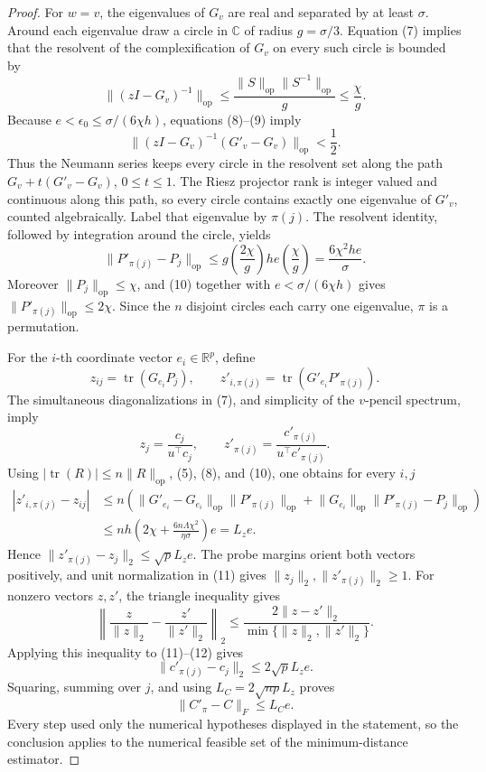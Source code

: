 \documentclass{article}
\begin{document}
\begin{proof}
For \(w=v\), the eigenvalues of \(G_v\) are real and separated by at least \(\sigma\). Around each eigenvalue draw a circle in \(\mathbb C\) of radius \(g=\sigma/3\). Equation (7) implies that the resolvent of the complexification of \(G_v\) on every such circle is bounded by
\[
 \lVert(zI-G_v)^{-1}\rVert_{\mathrm{op}}
 \le\frac{\lVert S\rVert_{\mathrm{op}}\lVert S^{-1}\rVert_{\mathrm{op}}}{g}
 \le\frac\chi g.
 \tag{9}
\]
Because \(e<\epsilon_0\le\sigma/(6\chi h)\), equations (8)--(9) imply
\[
 \lVert(zI-G_v)^{-1}(G'_v-G_v)\rVert_{\mathrm{op}}<\frac12.
\]
Thus the Neumann series keeps every circle in the resolvent set along the path \(G_v+t(G'_v-G_v)\), \(0\le t\le1\). The Riesz projector rank is integer valued and continuous along this path, so every circle contains exactly one eigenvalue of \(G'_v\), counted algebraically. Label that eigenvalue by \(\pi(j)\). The resolvent identity, followed by integration around the circle, yields
\[
 \lVert P'_{\pi(j)}-P_j\rVert_{\mathrm{op}}
 \le g\left(\frac{2\chi}{g}\right)he\left(\frac\chi g\right)
 =\frac{6\chi^2he}{\sigma}.
 \tag{10}
\]
Moreover \(\lVert P_j\rVert_{\mathrm{op}}\le\chi\), and (10) together with \(e<\sigma/(6\chi h)\) gives \(\lVert P'_{\pi(j)}\rVert_{\mathrm{op}}\le2\chi\). Since the \(n\) disjoint circles each carry one eigenvalue, \(\pi\) is a permutation.

For the \(i\)-th coordinate vector \(e_i\in\mathbb R^p\), define
\[
 z_{ij}=\operatorname{tr}(G_{e_i}P_j),
 \qquad
 z'_{i,\pi(j)}=\operatorname{tr}(G'_{e_i}P'_{\pi(j)}).
\]
The simultaneous diagonalizations in (7), and simplicity of the \(v\)-pencil spectrum, imply
\[
 z_j=\frac{c_j}{u^\top c_j},
 \qquad
 z'_{\pi(j)}=\frac{c'_{\pi(j)}}{u^\top c'_{\pi(j)}}.
 \tag{11}
\]
Using \(|\operatorname{tr}(R)|\le n\lVert R\rVert_{\mathrm{op}}\), (5), (8), and (10), one obtains for every \(i,j\)
\[
 \begin{aligned}
 |z'_{i,\pi(j)}-z_{ij}|
 &\le n\left(
 \lVert G'_{e_i}-G_{e_i}\rVert_{\mathrm{op}}
 \lVert P'_{\pi(j)}\rVert_{\mathrm{op}}
 +\lVert G_{e_i}\rVert_{\mathrm{op}}
 \lVert P'_{\pi(j)}-P_j\rVert_{\mathrm{op}}
 \right)\\
 &\le nh\left(2\chi+\frac{6n\Lambda\chi^2}{\eta\sigma}\right)e
 =L_ze.
 \end{aligned}
 \tag{12}
\]
Hence \(\lVert z'_{\pi(j)}-z_j\rVert_2\le\sqrt pL_ze\). The probe margins orient both vectors positively, and unit normalization in (11) gives \(\lVert z_j\rVert_2,\lVert z'_{\pi(j)}\rVert_2\ge1\). For nonzero vectors \(z,z'\), the triangle inequality gives
\[
 \left\lVert\frac z{\lVert z\rVert_2}-
 \frac{z'}{\lVert z'\rVert_2}\right\rVert_2
 \le\frac{2\lVert z-z'\rVert_2}
 {\min\{\lVert z\rVert_2,\lVert z'\rVert_2\}}.
\]
Applying this inequality to (11)--(12) gives
\[
 \lVert c'_{\pi(j)}-c_j\rVert_2\le2\sqrt pL_ze.
\]
Squaring, summing over \(j\), and using \(L_C=2\sqrt{np}L_z\) proves
\[
 \lVert C'_{\pi}-C\rVert_F\le L_Ce.
\]
Every step used only the numerical hypotheses displayed in the statement, so the conclusion applies to the numerical feasible set of the minimum-distance estimator.
\end{proof}
\end{document}
